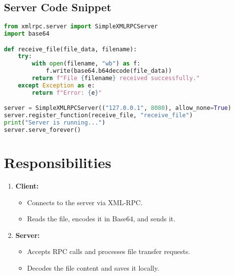 \documentclass[a4paper,12pt]{article}
\begin{document}
\subsection*{Server Code Snippet}
\begin{lstlisting}[language=python]
from xmlrpc.server import SimpleXMLRPCServer
import base64

def receive_file(file_data, filename):
    try:
        with open(filename, "wb") as f:
            f.write(base64.b64decode(file_data))
        return f"File {filename} received successfully."
    except Exception as e:
        return f"Error: {e}"

server = SimpleXMLRPCServer(("127.0.0.1", 8080), allow_none=True)
server.register_function(receive_file, "receive_file")
print("Server is running...")
server.serve_forever()
\end{lstlisting}

\section*{Responsibilities}
\begin{enumerate}
    \item \textbf{Client:}
    \begin{itemize}
        \item Connects to the server via XML-RPC.
        \item Reads the file, encodes it in Base64, and sends it.
    \end{itemize}
    \item \textbf{Server:}
    \begin{itemize}
        \item Accepts RPC calls and processes file transfer requests.
        \item Decodes the file content and saves it locally.
    \end{itemize}
\end{enumerate}
\end{document}
